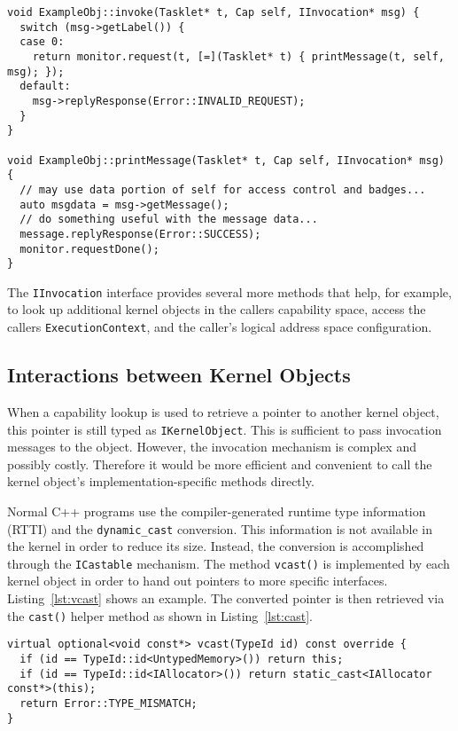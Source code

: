 \begin{lstlisting}[float, label=lst:invokehandler, caption=Example invocation
handler.]
void ExampleObj::invoke(Tasklet* t, Cap self, IInvocation* msg) {
  switch (msg->getLabel()) {
  case 0:
    return monitor.request(t, [=](Tasklet* t) { printMessage(t, self, msg); });
  default:
    msg->replyResponse(Error::INVALID_REQUEST);
  }
}

void ExampleObj::printMessage(Tasklet* t, Cap self, IInvocation* msg) {
  // may use data portion of self for access control and badges...
  auto msgdata = msg->getMessage();
  // do something useful with the message data...
  message.replyResponse(Error::SUCCESS);
  monitor.requestDone();
}
\end{lstlisting}

The \texttt{IInvocation} interface provides several more methods that
help, for example, to look up additional kernel objects in the callers
capability space, access the callers \texttt{ExecutionContext}, and
the caller's logical address space configuration.

\subsection{Interactions between Kernel Objects}

When a capability lookup is used to retrieve a pointer to another
kernel object, this pointer is still typed as
\texttt{IKernelObject}. This is sufficient to pass invocation messages
to the object. However, the invocation mechanism is complex and
possibly costly. Therefore it would be more efficient and convenient
to call the kernel object's implementation-specific methods
directly.

Normal C++ programs use the compiler-generated runtime type
information (RTTI) and the \texttt{dynamic\_cast} conversion. This
information is not available in the kernel in order to reduce its
size. Instead, the conversion is accomplished through the
\texttt{ICastable} mechanism. The method \texttt{vcast()} is
implemented by each kernel object in order to hand out pointers to
more specific interfaces. Listing~\ref{lst:vcast} shows an example.
The converted pointer is then retrieved via the \texttt{cast()} helper
method as shown in Listing~\ref{lst:cast}.

\begin{lstlisting}[float, label=lst:vcast, caption=Example run-time type conversion in the \texttt{UntypedMemory} object.]
virtual optional<void const*> vcast(TypeId id) const override {
  if (id == TypeId::id<UntypedMemory>()) return this;
  if (id == TypeId::id<IAllocator>()) return static_cast<IAllocator const*>(this);
  return Error::TYPE_MISMATCH;
}
\end{lstlisting}

